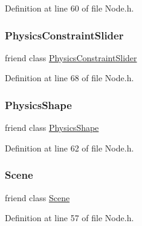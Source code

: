 Definition at line 60 of file Node.\+h.

\mbox{\label{classnjli_1_1_node_a6b9fa11eb22d1cb30e2d4fc2247e9afa}} 
\subsubsection{\texorpdfstring{Physics\+Constraint\+Slider}{PhysicsConstraintSlider}}
{\footnotesize\ttfamily friend class \mbox{\hyperlink{classnjli_1_1_physics_constraint_slider}{Physics\+Constraint\+Slider}}\hspace{0.3cm}{\ttfamily [friend]}}



Definition at line 68 of file Node.\+h.

\mbox{\label{classnjli_1_1_node_a726223aef7972f289c4a01ccfd23d5ee}} 
\subsubsection{\texorpdfstring{Physics\+Shape}{PhysicsShape}}
{\footnotesize\ttfamily friend class \mbox{\hyperlink{classnjli_1_1_physics_shape}{Physics\+Shape}}\hspace{0.3cm}{\ttfamily [friend]}}



Definition at line 62 of file Node.\+h.

\mbox{\label{classnjli_1_1_node_a032858ae1fe02d2d1170981c2af2d67c}} 
\subsubsection{\texorpdfstring{Scene}{Scene}}
{\footnotesize\ttfamily friend class \mbox{\hyperlink{classnjli_1_1_scene}{Scene}}\hspace{0.3cm}{\ttfamily [friend]}}



Definition at line 57 of file Node.\+h.

